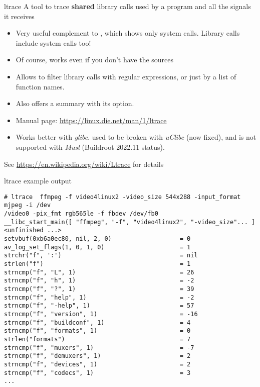 \begin{frame}{ltrace}
  A tool to trace {\bf shared} library calls used by a program and all the signals
  it receives
  \begin{itemize}
  \item Very useful complement to , which shows only system
    calls. Library calls include system calls too!
  \item Of course, works even if you don't have the sources
  \item Allows to filter library calls with regular expressions, or
    just by a list of function names.
  \item Also offers a summary with its  option.
  \item Manual page: \url{https://linux.die.net/man/1/ltrace}
  \item Works better with {\em glibc}.  used to be broken
        with {\em uClibc} (now fixed), and is not supported
        with {\em Musl} (Buildroot 2022.11 status).
  \end{itemize}
  See \url{https://en.wikipedia.org/wiki/Ltrace} for details
\end{frame}

\begin{frame}[fragile]{ltrace example output}
  \scriptsize
  \begin{block}{}
\begin{verbatim}
# ltrace  ffmpeg -f video4linux2 -video_size 544x288 -input_format mjpeg -i /dev
/video0 -pix_fmt rgb565le -f fbdev /dev/fb0
__libc_start_main([ "ffmpeg", "-f", "video4linux2", "-video_size"... ] <unfinished ...>
setvbuf(0xb6a0ec80, nil, 2, 0)                   = 0
av_log_set_flags(1, 0, 1, 0)                     = 1
strchr("f", ':')                                 = nil
strlen("f")                                      = 1
strncmp("f", "L", 1)                             = 26
strncmp("f", "h", 1)                             = -2
strncmp("f", "?", 1)                             = 39
strncmp("f", "help", 1)                          = -2
strncmp("f", "-help", 1)                         = 57
strncmp("f", "version", 1)                       = -16
strncmp("f", "buildconf", 1)                     = 4
strncmp("f", "formats", 1)                       = 0
strlen("formats")                                = 7
strncmp("f", "muxers", 1)                        = -7
strncmp("f", "demuxers", 1)                      = 2
strncmp("f", "devices", 1)                       = 2
strncmp("f", "codecs", 1)                        = 3
...
\end{verbatim}
\end{block}
\end{frame}

